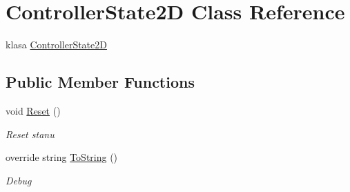 \hypertarget{class_controller_state2_d}{}\section{Controller\+State2\+D Class Reference}
\label{class_controller_state2_d}


klasa \hyperlink{class_controller_state2_d}{Controller\+State2\+D}  


\subsection*{Public Member Functions}
\begin{DoxyCompactItemize}
\item 
void \hyperlink{class_controller_state2_d_a227682256d3eabc548dcd982cbcb7aef}{Reset} ()
\begin{DoxyCompactList}\small\item\em Reset stanu \end{DoxyCompactList}\item 
override string \hyperlink{class_controller_state2_d_af8f1803156a41e5a8ca0c7c6a7f12865}{To\+String} ()
\begin{DoxyCompactList}\small\item\em Debug \end{DoxyCompactList}\end{DoxyCompactItemize}
